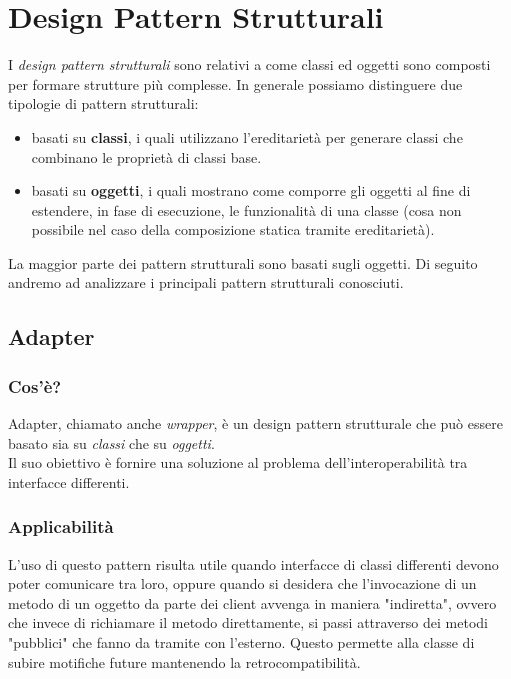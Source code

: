 \section{Design Pattern Strutturali}
I \textit{design pattern strutturali} sono relativi a come classi ed oggetti sono composti per formare strutture più complesse. In generale possiamo distinguere due tipologie di pattern strutturali:
\begin{itemize}
\item basati su \textbf{classi}, i quali utilizzano l'ereditarietà per generare classi che combinano le proprietà di classi base.
\item basati su \textbf{oggetti}, i quali mostrano come comporre gli oggetti al fine di estendere, in fase di esecuzione, le funzionalità di una classe (cosa non possibile nel caso della composizione statica tramite ereditarietà).
\end{itemize}
La maggior parte dei pattern strutturali sono basati sugli oggetti.
Di seguito andremo ad analizzare i principali pattern strutturali conosciuti.
\subsection{Adapter}
\subsubsection{Cos'è?}
Adapter, chiamato anche \textit{wrapper}, è un design pattern strutturale che può essere basato sia su \textit{classi} che su \textit{oggetti}.\\
Il suo obiettivo è fornire una soluzione al problema dell'interoperabilità tra interfacce differenti.
\subsubsection{Applicabilità}
L'uso di questo pattern risulta utile quando interfacce di classi differenti devono poter comunicare tra loro, oppure quando si desidera che l'invocazione di un metodo di un oggetto da parte dei client avvenga in maniera "indiretta", ovvero che invece di richiamare il metodo direttamente, si passi attraverso dei metodi "pubblici" che fanno da tramite con l'esterno. Questo permette alla classe di subire motifiche future mantenendo la retrocompatibilità.

